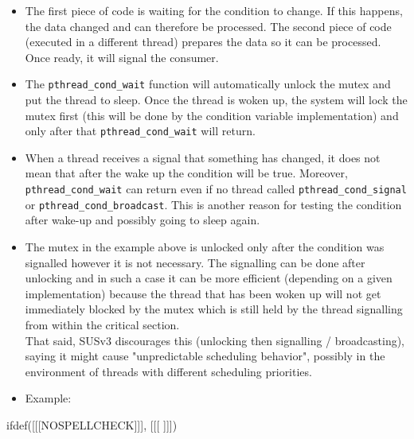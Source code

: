 \begin{itemize}
\prgchars
\item The first piece of code is waiting for the condition to change.  If this
happens, the data changed and can therefore be processed.  The second piece of
code (executed in a different thread) prepares the data so it can be processed.
Once ready, it will signal the consumer.  \item The \texttt{pthread\_cond\_wait}
function will automatically unlock the mutex and put the thread to sleep. Once
the thread is woken up, the system will lock the mutex first (this will be done
by the condition variable implementation) and only after that
\texttt{pthread\_cond\_wait} will return.
\item When a thread receives a signal that something has changed, it does not
mean that after the wake up the condition will be true. Moreover,
\texttt{pthread\_cond\_wait} can return even if no thread called
\texttt{pthread\_cond\_signal} or \texttt{pthread\_cond\_broadcast}.
This is another reason for testing the condition after wake-up and possibly
going to sleep again.
\item The mutex in the example above is unlocked only after the condition
was signalled however it is not necessary. The signalling can be done
after unlocking and in such a case it can be more efficient (depending on
a given implementation) because the thread that has been woken up will not get
immediately blocked by the mutex which is still held by the thread signalling
from within the critical section.
\\
That said, SUSv3 discourages this (unlocking then signalling / broadcasting),
saying it might cause "unpredictable scheduling behavior", possibly in the
environment of threads with different scheduling priorities.
\item {} Example:
\end{itemize}



ifdef([[[NOSPELLCHECK]]], [[[
]]])

